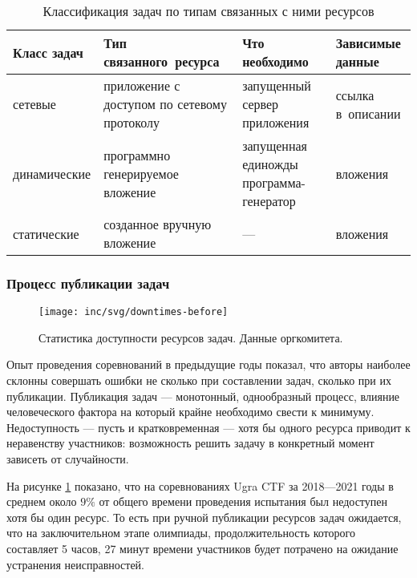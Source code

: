\begin{center}
  \begin{longtable}{|l|p{}|p{}|p{}|}
    \caption{Классификация задач по типам связанных с ними ресурсов}
    \label{tab:tasks}
    \\ \hline
    \textbf{Класс задач} & \textbf{Тип связанного~ресурса} & \textbf{Что необходимо} & \textbf{Зависимые данные}
    \\ \hline \endhead
   сетевые & приложение с доступом по сетевому протоколу & запущенный сервер приложения & ссылка в~описании
    \\ \hline
    динамические & программно генерируемое вложение & запущенная единожды программа-генератор & вложения
    \\ \hline
    статические & созданное вручную вложение & --- & вложения
    \\ \hline %
  \end{longtable}
\end{center}



\subsubsection{Процесс публикации задач}

\begin{figure}
  \centering
  \texttt{[image: inc/svg/downtimes-before]}
  \caption{Статистика доступности ресурсов задач. Данные оргкомитета.}
  \label{fig:downtimes-before}
\end{figure}

Опыт проведения соревнований в предыдущие годы показал, что авторы наиболее склонны совершать ошибки не сколько при составлении задач, сколько при их публикации. Публикация задач — монотонный, однообразный процесс, влияние человеческого фактора на который крайне необходимо свести к минимуму. Недоступность — пусть и кратковременная — хотя бы одного ресурса приводит к неравенству участников: возможность решить задачу в конкретный момент зависеть от случайности.

На рисунке \ref{fig:downtimes-before} показано, что на соревнованиях Ugra CTF за 2018---2021 годы в среднем около $9\%$ от общего времени проведения испытания был недоступен хотя бы один ресурс. То есть при ручной публикации ресурсов задач ожидается, что на заключительном этапе олимпиады, продолжительность которого составляет 5 часов, 27 минут времени участников будет потрачено на ожидание устранения неисправностей.

